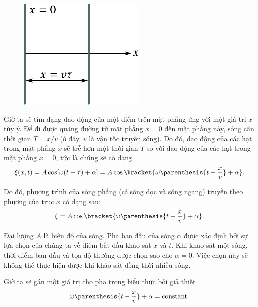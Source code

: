 \begin{figure}[!htb]
	\begin{center}
		\includegraphics[scale=1]{figures/ch_14/fig_14_4.pdf}
		\caption[]{}
		\label{fig:14_4}
	\end{center}
	\vspace{-0.85cm}
\end{figure}

\noindent
Giờ ta sẽ tìm dạng dao động của một điểm trên mặt phẳng ứng với một giá trị $x$ tùy ý. Để đi được quãng đường từ mặt phẳng $x=0$ đến mặt phẳng này, sóng cần thời gian $T=x/v$ (ở đây, $v$ là vận tốc truyền sóng). Do đó, dao động của các hạt trong mặt phẳng $x$ sẽ trễ hơn một thời gian $T$ so với dao động của các hạt trong mặt phẳng $x=0$, tức là chúng sẽ có dạng
\begin{equation*}
    \xi(x,t) = A \cos[\omega(t - \tau) + \alpha] = A \cos\bracket{ \omega \parenthesis{t - \frac{x}{v}} + \alpha}.
\end{equation*}

Do đó, phương trình của sóng phẳng (cả sóng dọc và sóng ngang) truyền theo phương của trục $x$ có dạng sau:
\begin{equation}\label{eq:14_4}
    \xi = A \cos\bracket{ \omega \parenthesis{t - \frac{x}{v}} + \alpha}.
\end{equation}

\noindent
Đại lượng $A$ là biên độ của sóng.
Pha ban đầu của sóng $\alpha$ được xác định bởi sự lựa chọn của chúng ta về điểm bắt đầu khảo sát $x$ và $t$.
Khi khảo sát một sóng, thời điểm ban đầu và tọa độ thường được chọn sao cho $\alpha=0$.
Việc chọn này sẽ không thể thực hiện được khi khảo sát đồng thời nhiều sóng.

Giờ ta sẽ gán một giá trị cho pha trong biểu thức  bởi giả thiết
\begin{equation}\label{eq:14_5}
    \omega \parenthesis{t - \frac{x}{v}} + \alpha = \text{constant}.
\end{equation}

